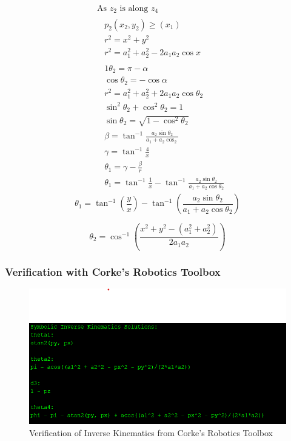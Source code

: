 \documentclass[12pt]{report}
\begin{document}
	\begin{equation}
		\begin{aligned}
			&\text { As } z_2 \text { is along } z_4\\
			&\begin{aligned}
				& p_2\left(x_2, y_2\right) \geq\left(x_1\right) \\
				& r^2=x^2+y^2 \\
				& r^2=a_1^2+a_2^2-2 a_1 a_2 \cos x
			\end{aligned}\\
			&\begin{aligned}
				& 1 \theta_2=\pi-\alpha \\
				& \cos \theta_2=-\cos \alpha \\
				& r^2=a_1^2+a_2^2+2 a_1 a_2 \cos \theta_2 \\
				& \sin ^2 \theta_2+\cos ^2 \theta_2=1 \\
				&  \sin \theta_2=\sqrt{1-\cos ^2 \theta_2} \\
				& \beta=\tan ^{-1} \frac{a_2 \sin \theta_2}{a_1+a_2 \cos _2} \\
				& \gamma=\tan ^{-1} \frac{4}{x} \\
				& \theta_1=\gamma-\frac{\beta}{r} \\
				& \theta_1=\tan ^{-1} \frac{1}{x}-\tan ^{-1} \frac{a_2 \sin \theta_2}{a_1+a_2 \cos \theta_2}
			\end{aligned}
		\end{aligned}
	\end{equation}
		\begin{equation}
		\theta_1 = \tan^{-1}\left(\frac{y}{x}\right) - \tan^{-1}\left(\frac{a_2 \sin \theta_2}{a_1 + a_2 \cos \theta_2}\right)
	\end{equation}
	
	\begin{equation}
		\theta_2 = \cos^{-1}\left(\frac{x^2 + y^2 - \left(a_1^2 + a_2^2\right)}{2 a_1 a_2}\right)
	\end{equation}

\subsubsection{Verification with Corke's Robotics Toolbox}
\begin{figure}[H]
	\centering
	\includegraphics[scale=1]{V1} %
	\caption{Verification of Inverse Kinematics from Corke's Robotics Toolbox}
	\label{V1} %
\end{figure}
\end{document}
